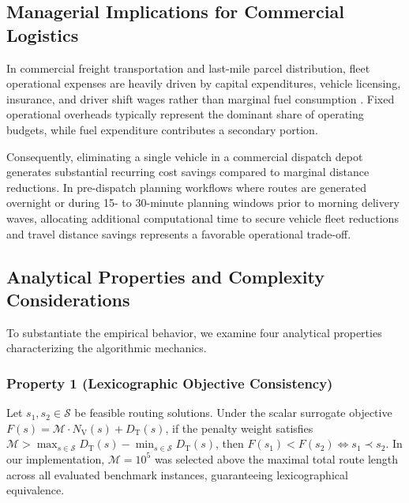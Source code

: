 \documentclass{ieeeaccess}
\newcommand{\NV}{{N_\mathrm{V}}}
\newcommand{\TD}{{D_\mathrm{T}}}
\begin{document}
\subsection{Managerial Implications for Commercial Logistics}
\label{sec:disc_managerial}

In commercial freight transportation and last-mile parcel distribution, fleet operational expenses are heavily driven by capital expenditures, vehicle licensing, insurance, and driver shift wages rather than marginal fuel consumption \cite{Toth2014, braysy2005vehicle}. Fixed operational overheads typically represent the dominant share of operating budgets, while fuel expenditure contributes a secondary portion.

Consequently, eliminating a single vehicle in a commercial dispatch depot generates substantial recurring cost savings compared to marginal distance reductions. In pre-dispatch planning workflows where routes are generated overnight or during 15- to 30-minute planning windows prior to morning delivery waves, allocating additional computational time to secure vehicle fleet reductions and travel distance savings represents a favorable operational trade-off.

\subsection{Analytical Properties and Complexity Considerations}
\label{sec:disc_theory}

To substantiate the empirical behavior, we examine four analytical properties characterizing the algorithmic mechanics.

\subsubsection{Property 1 (Lexicographic Objective Consistency)}
\label{prop:lex_consistency}
Let $s_1, s_2 \in \mathcal{S}$ be feasible routing solutions. Under the scalar surrogate objective $F(s) = \mathcal{M} \cdot \NV(s) + \TD(s)$, if the penalty weight satisfies $\mathcal{M} > \max_{s \in \mathcal{S}} \TD(s) - \min_{s \in \mathcal{S}} \TD(s)$, then $F(s_1) < F(s_2) \iff s_1 \prec s_2$. In our implementation, $\mathcal{M} = 10^5$ was selected above the maximal total route length across all evaluated benchmark instances, guaranteeing lexicographical equivalence.
\end{document}

